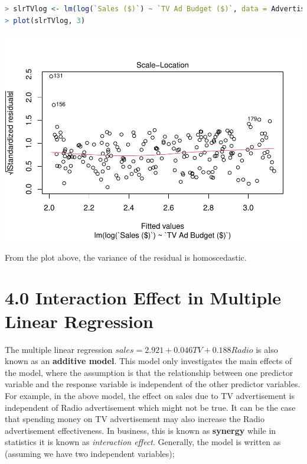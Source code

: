 \documentclass[
]{article}
\begin{document}
\begin{lstlisting}[language=R]
> slrTVlog <- lm(log(`Sales ($)`) ~ `TV Ad Budget ($)`, data = AdvertisingBudgetandSales)
> plot(slrTVlog, 3)
\end{lstlisting}

\includegraphics{Types-of-Regressions_files/figure-latex/unnamed-chunk-20-1.pdf}

From the plot above, the variance of the residual is homoscedastic.

\newpage

\hypertarget{interaction-effect-in-multiple-linear-regression}{%
\section{4.0 Interaction Effect in Multiple Linear
Regression}\label{interaction-effect-in-multiple-linear-regression}}

The multiple linear regression \(sales=2.921+0.046TV+0.188Radio\) is
also known as an \textbf{additive model}. This model only investigates
the main effects of the model, where the assumption is that the
relationship between one predictor variable and the response variable is
independent of the other predictor variables. For example, in the above
model, the effect on sales due to TV advertisement is independent of
Radio advertisement which might not be true. It can be the case that
spending money on TV advertisement may also increase the Radio
advertisement effectiveness. In business, this is known as
\textbf{synergy} while in statistics it is known as \emph{interaction
effect}. Generally, the model is written as (assuming we have two
independent variables);
\end{document}
